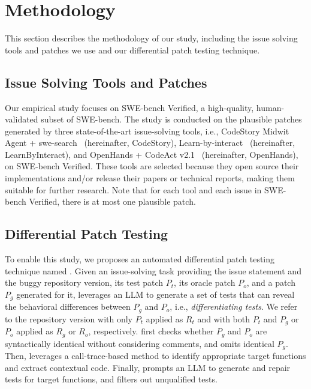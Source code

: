 \section{Methodology}
This section describes the methodology of our study, including the issue solving tools and patches we use and our differential patch testing technique.

%

\subsection{Issue Solving Tools and Patches}
Our empirical study focuses on SWE-bench Verified, a high-quality, human-validated subset of SWE-bench.
The study is conducted on the plausible patches generated by three state-of-the-art issue-solving tools, i.e., CodeStory Midwit Agent + swe-search~\cite{codestory} (hereinafter, CodeStory), Learn-by-interact~\cite{su2025learn} (hereinafter, LearnByInteract), and OpenHands + CodeAct v2.1~\cite{wang2024openhands} (hereinafter, OpenHands), on SWE-bench Verified.
These tools are selected because they open source their implementations and/or release their papers or technical reports, making them suitable for further research.
Note that for each tool and each issue in SWE-bench Verified, there is at most one plausible patch.

\subsection{Differential Patch Testing}
To enable this study, we proposes an automated differential patch testing technique named \appname.
Given an issue-solving task providing the issue statement and the buggy repository version, its test patch $P_t$, its oracle patch $P_o$, and a patch $P_g$ generated for it, \appname leverages an LLM to generate a set of tests that can reveal the behavioral differences between $P_g$ and $P_o$, i.e., \emph{differentiating tests}.
We refer to the repository version with only $P_t$ applied as $R_t$ and with both $P_t$ and $P_g$ or $P_o$ applied as $R_g$ or $R_o$, respectively.
\appname first checks whether $P_g$ and $P_o$ are syntactically identical without considering comments, and omits identical $P_g$.
Then, \appname leverages a call-trace-based method to identify appropriate target functions and extract contextual code.
Finally, \appname prompts an LLM to generate and repair tests for target functions, and filters out unqualified tests.

